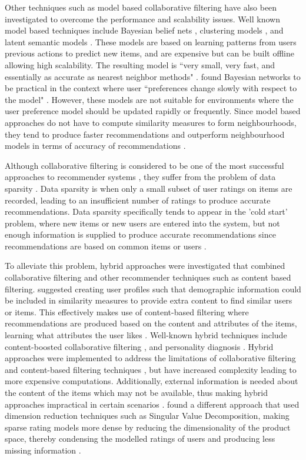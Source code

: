 Other techniques such as model based collaborative filtering have also been investigated to overcome the performance and scalability issues. Well known model based techniques include Bayesian belief nets \cite{baysian}, clustering models \cite{clustering}, and latent semantic models \cite{latent}. These models are based on learning patterns from users previous actions to predict new items, and are expensive but can be built offline allowing high scalability. The resulting model is ``very small, very fast, and essentially as accurate as nearest neighbor methods" \cite{itembased}. \citeauthor{itembased} found Bayesian networks to be practical in the context where user ``preferences change slowly with respect to the model" \cite{itembased}. However, these models are not suitable for environments where the user preference model should be updated rapidly or frequently. Since model based approaches do not have to compute similarity measures to form neighbourhoods, they tend to produce faster recommendations and outperform neighbourhood models in terms of accuracy of recommendations \cite{toward, itembased}. 

Although collaborative filtering is considered to be one of the most successful approaches to recommender systems \cite{survey, toward}, they suffer from the problem of data sparsity \cite{toward, survey, itembased, koren2009matrix, koren2011, dimension}. Data sparsity is when only a small subset of user ratings on items are recorded, leading to an insufficient number of ratings to produce accurate recommendations. Data sparsity specifically tends to appear in the 'cold start' problem, where new items or new users are entered into the system, but not enough information is supplied to produce accurate recommendations since recommendations are based on common items or users \cite{survey}.

To alleviate this problem, hybrid approaches were investigated that combined collaborative filtering and other recommender techniques such as content based filtering. \citeauthor{toward} suggested creating user profiles such that demographic information could be included in similarity measures to provide extra content to find similar users or items. This effectively makes use of content-based filtering where recommendations are produced based on the content and attributes of the items, learning what attributes the user likes \cite{toward}. Well-known hybrid techniques include content-boosted collaborative filtering \cite{hybrid}, and personality diagnosis \cite{hybrid2, survey}. Hybrid approaches were implemented to address the limitations of collaborative filtering and content-based filtering techniques \cite{toward}, but have increased complexity leading to more expensive computations. Additionally, external information is needed about the content of the items which may not be available, thus making hybrid approaches impractical in certain scenarios \cite{survey}. \citeauthor{dimension} found a different approach that used dimension reduction techniques such as Singular Value Decomposition, making sparse rating models more dense by reducing the dimensionality of the product space, thereby condensing the modelled ratings of users and producing less missing information \cite{dimension}. 


